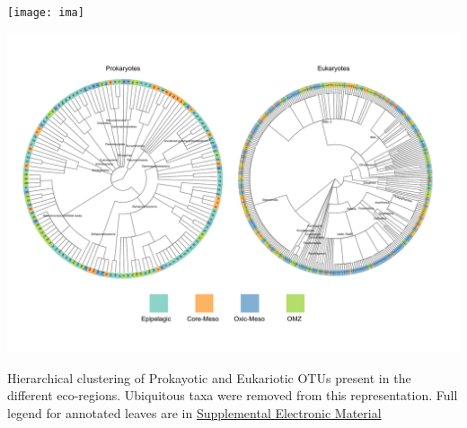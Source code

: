 \documentclass[fleqn,10pt]{wlscirep}
\begin{document}
\begin{suppfigure}[ht]
    \centering
    \texttt{[image: ima]}
\end{suppfigure}

\begin{suppfigure}[ht]
    \centering
    \includegraphics[scale=0.6, origin=c]{images/Trees_OTU_sup_v2.pdf}
    \caption{Hierarchical clustering of Prokayotic and Eukariotic OTUs present in the different eco-regions. Ubiquitous taxa were removed from this representation. Full legend for annotated leaves are in \href{https://docs.google.com/spreadsheets/d/1N1xzjx8YBxD9Trgy7jHuE1G6fmDtgE7f3KkcxjNAJyc/edit?usp=sharing}{Supplemental Electronic Material}}
    \label{fig:tax_trees_sup}
\end{suppfigure}
\clearpage
\end{document}

